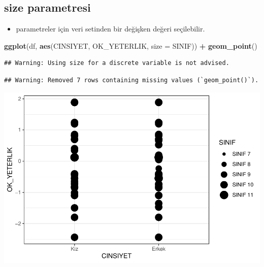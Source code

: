 \documentclass[
  oneside]{book}
\newenvironment{Shaded}{\begin{snugshade}}{\end{snugshade}}
\newcommand{\AttributeTok}[1]{\textcolor[rgb]{0.13,0.29,0.53}{#1}}
\newcommand{\FunctionTok}[1]{\textcolor[rgb]{0.13,0.29,0.53}{\textbf{#1}}}
\newcommand{\NormalTok}[1]{#1}
\newcommand{\SpecialCharTok}[1]{\textcolor[rgb]{0.81,0.36,0.00}{\textbf{#1}}}
\providecommand{\tightlist}{%
  \setlength{\itemsep}{0pt}\setlength{\parskip}{0pt}}
\begin{document}
\hypertarget{size-parametresi}{%
\subsection{\texorpdfstring{\textbf{size} parametresi}{size parametresi}}\label{size-parametresi}}

\begin{itemize}
\tightlist
\item
  parametreler için veri setinden bir değişken değeri seçilebilir.
\end{itemize}

\begin{Shaded}
\begin{Highlighting}[]
\FunctionTok{ggplot}\NormalTok{(df, }\FunctionTok{aes}\NormalTok{(CINSIYET, OK\_YETERLIK, }\AttributeTok{size =}\NormalTok{ SINIF)) }\SpecialCharTok{+}
  \FunctionTok{geom\_point}\NormalTok{()}
\end{Highlighting}
\end{Shaded}

\begin{verbatim}
## Warning: Using size for a discrete variable is not advised.
\end{verbatim}

\begin{verbatim}
## Warning: Removed 7 rows containing missing values (`geom_point()`).
\end{verbatim}

\begin{center}\includegraphics[width=1\linewidth]{15-betimleyici-istatistik_files/figure-latex/unnamed-chunk-45-1} \end{center}
\end{document}
